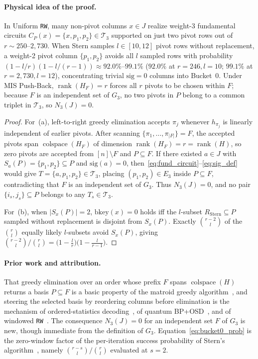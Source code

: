 \documentclass[12pt]{article}
\theoremstyle{definition}
\DeclareMathOperator{\rank}{rank}
\newcommand{\Tc}{\mathcal{T}_3}
\newcommand{\ttt}[1]{\texttt{#1}}
\begin{document}
\paragraph{Physical idea of the proof.}
In Uniform \ttt{RW}, many non-pivot columns $x \in J$ realize weight-3 fundamental circuits $C_P(x) = \{x, p_1,
p_2\} \in \Tc$ supported on just two pivot rows out of $r \sim 250$--$2{,}730$. When Stern samples $l \in [10, 12]$
pivot rows without replacement, a weight-2 pivot column $\{p_1, p_2\}$ avoids all $l$ sampled rows with probability
$(1 - l/r)(1 - l/(r-1)) \approx 92.0\%$--$99.1\%$ ($92.0\%$ at $r = 246, l = 10$; $99.1\%$ at $r = 2{,}730, l =
12$), concentrating trivial $\mathrm{sig} = 0$ columns into Bucket~0. Under MIS Push-Back, $\rank(H_F) = r$ forces
all $r$ pivots to be chosen within $F$; because $F$ is an independent set of $G_3$, no two pivots in $P$ belong to a
common triplet in $\Tc$, so $N_3(J) = 0$.

\begin{proof}
For~(a), left-to-right greedy elimination accepts $\pi_j$ whenever $h_{\pi_j}$ is linearly independent of earlier
pivots. After scanning $\{\pi_1, \dots, \pi_{|F|}\} = F$, the accepted pivots span $\operatorname{colspace}(H_F)$ of
dimension $\rank(H_F) = r = \rank(H)$, so zero pivots are accepted from $[n] \setminus F$ and $P \subseteq F$. If
there existed $a \in J$ with $S_a(P) = \{p_1, p_2\} \subseteq P$ and $\mathrm{sig}(a) = 0$,
then~\eqref{eq:fund_circuit}--\eqref{eq:sig_def} would give $T = \{a, p_1, p_2\} \in \Tc$, placing $(p_1, p_2) \in
E_3$ inside $P \subseteq F$, contradicting that $F$ is an independent set of $G_3$. Thus $N_3(J) = 0$, and no pair
$\{i_s, j_s\} \subseteq P$ belongs to any $T_s \in \Tc$.

For~(b), when $|S_x(P)| = 2$, $\mathrm{bkey}(x) = 0$ holds iff the $l$-subset $R_{\mathrm{Stern}} \subseteq P$
sampled without replacement is disjoint from $S_x(P)$. Exactly $\binom{r-2}{l}$ of the $\binom{r}{l}$ equally likely
$l$-subsets avoid $S_x(P)$, giving $\binom{r-2}{l} / \binom{r}{l} = \bigl(1 - \frac{l}{r}\bigr)\bigl(1 -
\frac{l}{r-1}\bigr)$.
\end{proof}

\paragraph{Prior work and attribution.}
That greedy elimination over an order whose prefix $F$ spans $\operatorname{colspace}(H)$ returns a basis $P
\subseteq F$ is a basic property of the matroid greedy algorithm~\cite{Rado1957,Edmonds1971,Oxley2011}, and steering
the selected basis by reordering columns before elimination is the mechanism of ordered-statistics
decoding~\cite{FossorierLin1995}, of quantum BP+OSD~\cite{PanteleevKalachev2021}, and of windowed
\ttt{RW}~\cite{PryadkoZeng2026DistM4RI}. The consequence $N_3(J) = 0$ for an independent set $F$ of $G_3$ is new,
though immediate from the definition of $G_3$. Equation~\eqref{eq:bucket0_prob} is the zero-window factor of the
per-iteration success probability of Stern's algorithm~\cite{Stern1988,CanteautChabaud1998,BernsteinLangePeters2008},
namely $\binom{r-s}{l}/\binom{r}{l}$ evaluated at $s = 2$.
\end{document}
